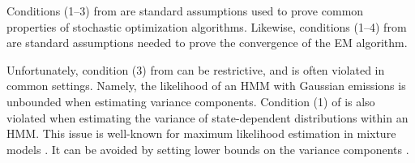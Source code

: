 


Conditions (1--3) from \citet{Johnson:2013} are standard assumptions used to prove common properties of stochastic optimization algorithms. Likewise, conditions (1--4) from \citet{Wu:1983} are standard assumptions needed to prove the convergence of the EM algorithm. 

Unfortunately, condition (3) from \citet{Wu:1983} can be restrictive, and is often violated in common settings. Namely, the likelihood of an HMM with Gaussian emissions is unbounded when estimating variance components. Condition (1) of \citet{Johnson:2013} is also violated when estimating the variance of state-dependent distributions within an HMM. This issue is well-known for maximum likelihood estimation in mixture models \citep{Chen:2009,Liu:2015b}. It can be avoided by setting lower bounds on the variance components \citep{Zucchini:2016}. %


